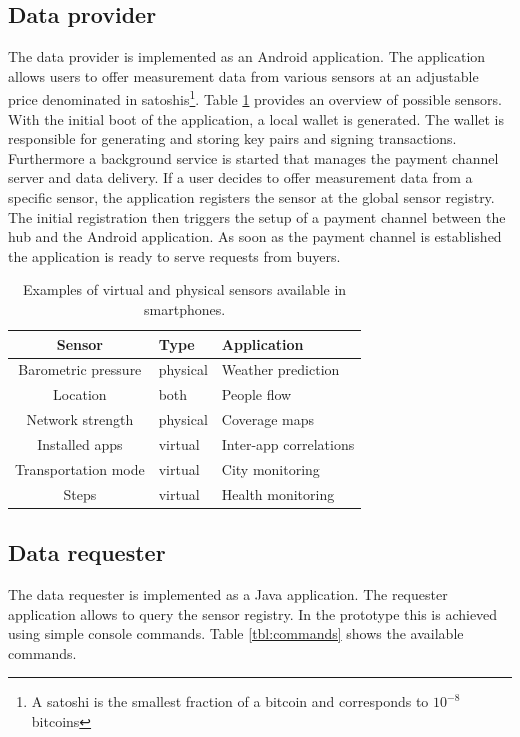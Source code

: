 \documentclass[10pt,journal,compsoc]{IEEEtran}
\newcommand\tabhead[1]{\small\textbf{#1}}
\begin{document}
\subsection{Data provider}

The data provider is implemented as an Android application. The application allows users to offer measurement data from various sensors at an adjustable price denominated in satoshis\footnote{A satoshi is the smallest fraction of a bitcoin and corresponds to $10^{-8}$ bitcoins}. Table \ref{tbl:sensors} provides an overview of possible sensors. With the initial boot of the application, a local wallet is generated. The wallet is responsible for generating and storing key pairs and signing transactions. Furthermore a background service is started that manages the payment channel server and data delivery. If a user decides to offer measurement data from a specific sensor, the application registers the sensor at the global sensor registry. The initial registration then triggers the setup of a payment channel between the hub and the Android application. As soon as the payment channel is established the application is ready to serve requests from buyers.


\begin{table}
  \centering
  \caption{Examples of virtual and physical sensors available in smartphones.}
  \begin{tabular}{|c|l|l|}
    \hline
    \tabhead{Sensor} &
    \tabhead{Type} &
    \tabhead{Application} \\
    \hline
    Barometric pressure & physical & Weather prediction \\
    \hline
    Location & both & People flow  \\
    \hline
    Network strength & physical & Coverage maps \\
    \hline
    Installed apps & virtual & Inter-app correlations    \\
    \hline
    Transportation mode & virtual & City monitoring \\
    \hline
    Steps & virtual & Health monitoring  \\
    \hline
  \end{tabular}
  \label{tbl:sensors}
\end{table}


\subsection{Data requester}
The data requester is implemented as a Java application. The requester application allows to query the sensor registry. In the prototype this is achieved using simple console commands. Table \ref{tbl:commands} shows the available commands.
\end{document}
